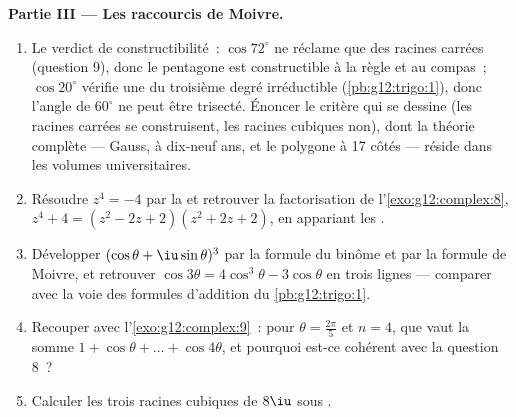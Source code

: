 \begin{problem}
\medskip
\noindent\textbf{Partie III --- Les raccourcis de Moivre.}
\begin{enumerate}[resume]
  \item Le verdict de constructibilité~: $\cos 72^\circ$ ne réclame
        que des racines carrées (question 9), donc le pentagone est
        constructible à la règle et au compas~; $\cos 20^\circ$
        vérifie une  du troisième degré irréductible
        (\cref{pb:g12:trigo:1}), donc l'angle de $60^\circ$ ne peut
        être trisecté. Énoncer le critère qui se dessine (les
        racines carrées se construisent, les racines cubiques non),
        dont la théorie complète --- Gauss, à dix-neuf ans, et le
        polygone à 17 côtés --- réside dans les volumes
        universitaires.
  \item Résoudre $z^4 = -4$ par la  et retrouver
        la factorisation de l'\cref{exo:g12:complex:8},
        $z^4 + 4 = (z^2 - 2z + 2)(z^2 + 2z + 2)$, en appariant les
         .
  \item Développer $(\cos\theta + \iu\sin\theta)^3$ par la formule
        du binôme et par la formule de Moivre, et retrouver
        $\cos 3\theta = 4\cos^3\theta - 3\cos\theta$ en trois lignes
        --- comparer avec la voie des formules d'addition du
        \cref{pb:g12:trigo:1}.
  \item Recouper avec l'\cref{exo:g12:complex:9}~: pour
        $\theta = \frac{2\pi}{5}$ et $n = 4$, que vaut la somme
        $1 + \cos\theta + \dots + \cos 4\theta$, et pourquoi
        est-ce cohérent avec la question 8~?
  \item Calculer les trois racines cubiques de $8\iu$ sous .
\end{enumerate}


\end{problem}
